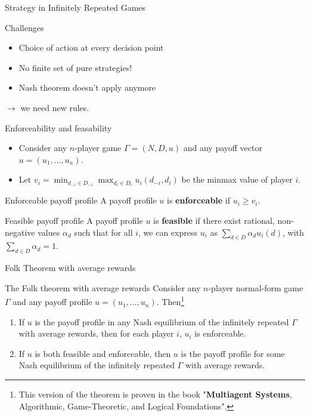 \begin{frame}{Strategy in Infinitely Repeated Games}
    \begin{alertblock}{Challenges}
        \begin{itemize}
            \item Choice of action at every decision point
            \item No finite set of pure strategies!
            \item Nash theorem doesn't apply anymore
        \end{itemize}
        $\rightarrow$ we need new rules.
    \end{alertblock}
\end{frame}

\begin{frame}{Enforceability and feasability}
    \begin{itemize}
        \item Consider any $n$-player game $\Gamma = (N, D, u)$ and any payoff vector
        $u = (u_1, \dots, u_n)$.
        \item Let $v_i= \min_{d_{-i}\in D_{-i}} \max_{d_i\in D_i} u_i(d_{-i}, d_i)$ be
        the minmax value of player $i$.
    \end{itemize}

    \begin{block}{Enforceable payoff profile}
        A payoff profile $u$ is \textbf{enforceable} if $u_i \geq v_i$.
    \end{block}

    \begin{block}{Feasible payoff profile}
        A payoff profile $u$ is \textbf{feasible} if there exist rational, non-negative
        values $\alpha_d$ such that for all $i$, we can express $u_i$ as
        $\sum_{d\in D} \alpha_d u_i(d)$, with $\sum_{d\in D} \alpha_d = 1$.
    \end{block}
\end{frame}

\begin{frame}{Folk Theorem with average rewards}

    \begin{block}{The Folk theorem with average rewards}
        Consider any $n$-player normal-form game $\Gamma$ and any payoff profile
        $u = (u_1, \dots, u_n)$. Then\footnote{This version of the theorem is proven
        in the book "\textbf{Multiagent Systems}, Algorithmic, Game-Theoretic, and Logical
        Foundations".}
        \begin{enumerate}
            \item If $u$ is the payoff profile in any Nash equilibrium of the infinitely
            repeated $\Gamma$ with average rewards, then for each player $i$, $u_i$ is enforceable.
            \item If $u$ is both feasible and enforceable, then $u$ is the payoff profile for some
            Nash equilibrium of the infinitely repeated $\Gamma$ with average rewards.
        \end{enumerate}
    \end{block}
\end{frame}

